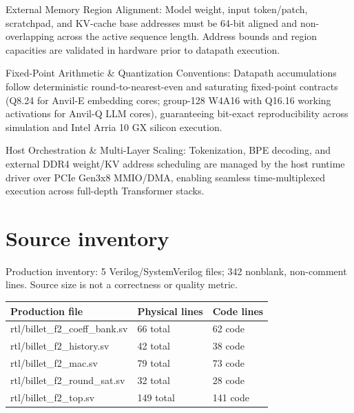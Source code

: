\documentclass[11pt,a4paper]{article}
\begin{document}
External Memory Region Alignment: Model weight,\allowbreak{} input token/\allowbreak{}patch,\allowbreak{} scratchpad,\allowbreak{} and KV-cache base addresses must be 64-bit aligned and non-overlapping across the active sequence length. Address bounds and region capacities are validated in hardware prior to datapath execution.


Fixed-Point Arithmetic \& Quantization Conventions: Datapath accumulations follow deterministic round-to-nearest-even and saturating fixed-point contracts (\allowbreak{}Q8.24 for Anvil-E embedding cores; group-128 W4A16 with Q16.16 working activations for Anvil-Q LLM cores)\allowbreak{},\allowbreak{} guaranteeing bit-exact reproducibility across simulation and Intel Arria 10 GX silicon execution.


Host Orchestration \& Multi-Layer Scaling: Tokenization,\allowbreak{} BPE decoding,\allowbreak{} and external DDR4 weight/\allowbreak{}KV address scheduling are managed by the host runtime driver over PCIe Gen3x8 MMIO/\allowbreak{}DMA,\allowbreak{} enabling seamless time-multiplexed execution across full-depth Transformer stacks.


\appendix{}\section{Source inventory}

Production inventory: 5 Verilog/\allowbreak{}SystemVerilog files; 342 nonblank,\allowbreak{} non-comment lines. Source size is not a correctness or quality metric.

{\small\renewcommand{\arraystretch}{1.18}\begin{longtable}{@{}L{0.55\textwidth}|L{0.18\textwidth}|L{0.18\textwidth}@{}}\toprule

\textbf{Production file} & \textbf{Physical lines} & \textbf{Code lines}\\\midrule\endhead

rtl/\allowbreak{}billet\_\allowbreak{}f2\_\allowbreak{}coeff\_\allowbreak{}bank.sv & 66 total & 62 code\\[2pt]\hline

rtl/\allowbreak{}billet\_\allowbreak{}f2\_\allowbreak{}history.sv & 42 total & 38 code\\[2pt]\hline

rtl/\allowbreak{}billet\_\allowbreak{}f2\_\allowbreak{}mac.sv & 79 total & 73 code\\[2pt]\hline

rtl/\allowbreak{}billet\_\allowbreak{}f2\_\allowbreak{}round\_\allowbreak{}sat.sv & 32 total & 28 code\\[2pt]\hline

rtl/\allowbreak{}billet\_\allowbreak{}f2\_\allowbreak{}top.sv & 149 total & 141 code\\[2pt]\hline

\bottomrule\end{longtable}}
\end{document}
